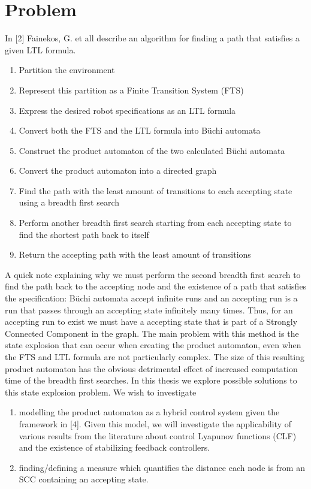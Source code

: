 \documentclass[11pt,a4paper]{article}
\begin{document}
\section{Problem}
In [2] Fainekos, G. et all describe an algorithm for finding a path that satisfies a given LTL formula. 

\begin{enumerate}
    \item Partition the environment
    \item Represent this partition as a Finite Transition System (FTS)
    \item Express the desired robot specifications as an LTL formula
    \item Convert both the FTS and the LTL formula into  B\"{u}chi automata
    \item Construct the product automaton of the two calculated B\"{u}chi automata
    \item Convert the product automaton into a directed graph
    \item Find the path with the least amount of transitions to each accepting state using a breadth first search
    \item Perform another breadth first search starting from each accepting state to find the shortest path back to itself
    \item Return the accepting path with the least amount of transitions
\end{enumerate}

A quick note explaining why we must perform the second breadth first search to find the path back to the accepting node and the existence of a path that satisfies the specification: B\"{u}chi automata accept infinite runs and an accepting run is a run that passes through an accepting state infinitely many times. Thus, for an accepting run to exist we must have a accepting state that is part of a Strongly Connected Component in the graph.
The main problem with this method is the state explosion that can occur when creating the product automaton, even when the FTS and LTL formula are not particularly complex. The size of this resulting product automaton has the obvious detrimental effect of increased computation time of the breadth first searches. In this thesis we explore possible solutions to this state explosion problem. We wish to investigate
\begin{enumerate}
    \item modelling the product automaton as a hybrid control system given the framework in [4]. Given this model, we will investigate the applicability of various results from the literature about control Lyapunov functions (CLF) and the existence of stabilizing feedback controllers.
    \item finding/defining a measure which quantifies the distance each node is from an SCC containing an accepting state.
\end{enumerate}
\end{document}
